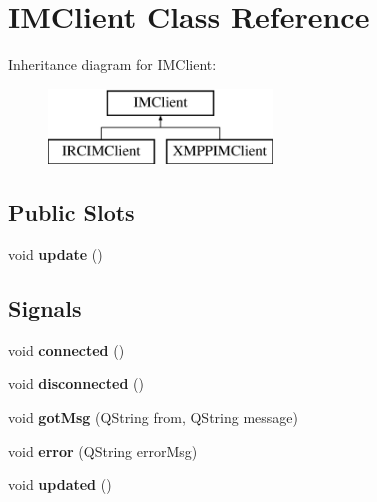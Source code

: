 \hypertarget{classIMClient}{
\section{IMClient Class Reference}
\label{classIMClient}
}
Inheritance diagram for IMClient:\begin{figure}[H]
\begin{center}
\leavevmode
\includegraphics[height=2cm]{classIMClient}
\end{center}
\end{figure}
\subsection*{Public Slots}
\begin{DoxyCompactItemize}
\item 
\hypertarget{classIMClient_a5cb299419096c59ccef91f9dd0ba6331}{
void {\bfseries update} ()}
\label{classIMClient_a5cb299419096c59ccef91f9dd0ba6331}

\end{DoxyCompactItemize}
\subsection*{Signals}
\begin{DoxyCompactItemize}
\item 
\hypertarget{classIMClient_ace3cf2c98aabf8ddb3e520999fec4d33}{
void {\bfseries connected} ()}
\label{classIMClient_ace3cf2c98aabf8ddb3e520999fec4d33}

\item 
\hypertarget{classIMClient_accf2c37275ce59315beed0d2686034c2}{
void {\bfseries disconnected} ()}
\label{classIMClient_accf2c37275ce59315beed0d2686034c2}

\item 
\hypertarget{classIMClient_a0b67d9ebc4be827aac031e813550c058}{
void {\bfseries gotMsg} (QString from, QString message)}
\label{classIMClient_a0b67d9ebc4be827aac031e813550c058}

\item 
\hypertarget{classIMClient_a897dd85750829af5f0dc7dbfb0e9670d}{
void {\bfseries error} (QString errorMsg)}
\label{classIMClient_a897dd85750829af5f0dc7dbfb0e9670d}

\item 
\hypertarget{classIMClient_abe10b1bd73bbdc72e401bf0b1ff33b31}{
void {\bfseries updated} ()}
\label{classIMClient_abe10b1bd73bbdc72e401bf0b1ff33b31}

\end{DoxyCompactItemize}
